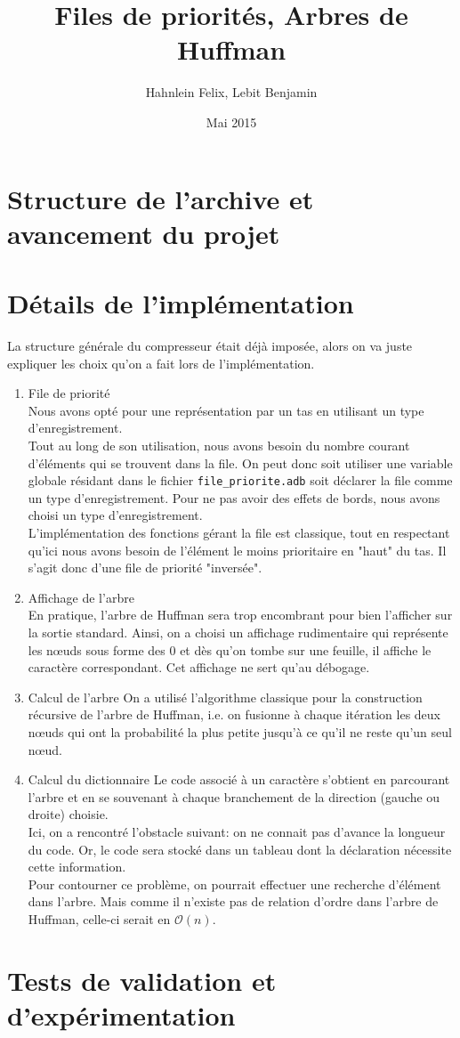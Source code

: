 \documentclass[a4paper,11pt]{article}
\title{Files de priorités, Arbres de Huffman}
\author{Hahnlein Felix, Lebit Benjamin}
\date{Mai 2015}
\begin{document}
\maketitle

\section{Structure de l'archive et avancement du projet}

\section{Détails de l'implémentation}
	La structure générale du compresseur était déjà imposée, alors on va juste expliquer les choix qu'on a fait lors de l'implémentation.
	\begin{enumerate}
		\item{File de priorité}\\
			Nous avons opté pour une représentation par un tas en utilisant un type d'enregistrement. \\
			Tout au long de son utilisation, nous avons besoin du nombre courant d'éléments qui se trouvent dans la file. On peut donc soit utiliser une variable globale résidant dans le fichier \verb+file_priorite.adb+ soit déclarer la file comme un type d'enregistrement. Pour ne pas avoir des effets de bords, nous avons choisi un type d'enregistrement.\\
			L'implémentation des fonctions gérant la file est classique, tout en respectant qu'ici nous avons besoin de l'élément le moins prioritaire en "haut" du tas. Il s'agit donc d'une file de priorité "inversée".
		\item{Affichage de l'arbre}\\
			En pratique, l'arbre de Huffman sera trop encombrant pour bien l'afficher sur la sortie standard. Ainsi, on a choisi un affichage rudimentaire qui représente les n\oe{}uds sous forme des $0$ et dès qu'on tombe sur une feuille, il affiche le caractère correspondant. Cet affichage ne sert qu'au débogage.
		\item{Calcul de l'arbre}
			On a utilisé l'algorithme classique pour la construction récursive de l'arbre de Huffman, i.e. on fusionne à chaque itération les deux n\oe{}uds qui ont la probabilité la plus petite jusqu'à ce qu'il ne reste qu'un seul n\oe{}ud.
		\item{Calcul du dictionnaire}
			Le code associé à un caractère s'obtient en parcourant l'arbre et en se souvenant à chaque branchement de la direction (gauche ou droite) choisie.\\
			Ici, on a rencontré l'obstacle suivant: on ne connait pas d'avance la longueur du code. Or, le code sera stocké dans un tableau dont la déclaration nécessite cette information.\\
			Pour contourner ce problème, on pourrait effectuer une recherche d'élément dans l'arbre. Mais comme il n'existe pas de relation d'ordre dans l'arbre de Huffman, celle-ci serait en $\mathcal{O}(n)$.
	\end{enumerate}

\section{Tests de validation et d'expérimentation} 
\end{document}
